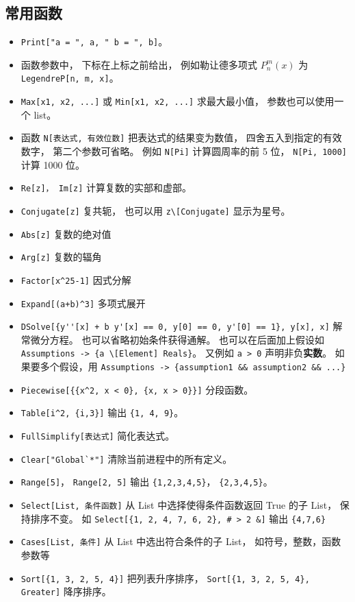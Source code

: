 \subsection{常用函数}
\begin{itemize}
\item \verb`Print["a = ", a, " b = ", b]`。
\item 函数参数中， 下标在上标之前给出， 例如勒让德多项式 $P_n^m(x)$ 为 \verb`LegendreP[n, m, x]`。
\item \verb`Max[x1, x2, ...]` 或 \verb`Min[x1, x2, ...]` 求最大最小值， 参数也可以使用一个 list。
\item 函数 \verb`N[表达式, 有效位数]` 把表达式的结果变为数值， 四舍五入到指定的有效数字， 第二个参数可省略。 例如 \verb`N[Pi]` 计算圆周率的前 5 位， \verb`N[Pi, 1000]` 计算 1000 位。
\item \verb`Re[z]， Im[z]` 计算复数的实部和虚部。
\item \verb`Conjugate[z]` 复共轭， 也可以用 \verb`z\[Conjugate]` 显示为星号。
\item \verb`Abs[z]` 复数的绝对值
\item \verb`Arg[z]` 复数的辐角
\item \verb`Factor[x^25-1]` 因式分解
\item \verb`Expand[(a+b)^3]` 多项式展开
\item \verb`DSolve[{y''[x] + b y'[x] == 0, y[0] == 0, y'[0] == 1}, y[x], x]` 解常微分方程。 也可以省略初始条件获得通解。 也可以在后面加上假设如 \verb`Assumptions -> {a \[Element] Reals}`。 又例如 \verb`a > 0` 声明非负\textbf{实数}。 如果要多个假设，用 \verb`Assumptions -> {assumption1 && assumption2 && ...}`
\item \verb`Piecewise[{{x^2, x < 0}, {x, x > 0}}]` 分段函数。
\item \verb`Table[i^2, {i,3}]` 输出 \verb`{1, 4, 9}`。
\item \verb`FullSimplify[表达式]` 简化表达式。
\item \verb|Clear["Global`*"]| 清除当前进程中的所有定义。
\item \verb`Range[5]`， \verb`Range[2, 5]` 输出 \verb`{1,2,3,4,5}`， \verb`{2,3,4,5}`。
\item \verb`Select[List, 条件函数]` 从 List 中选择使得条件函数返回 True 的子 List， 保持排序不变。 如 \verb`Select[{1, 2, 4, 7, 6, 2}, # > 2 &]` 输出 \verb`{4,7,6}`
\item \verb`Cases[List, 条件]` 从 List 中选出符合条件的子 List， 如符号，整数，函数参数等
\item \verb`Sort[{1, 3, 2, 5, 4}]` 把列表升序排序， \verb`Sort[{1, 3, 2, 5, 4}, Greater]` 降序排序。

\end{itemize}
